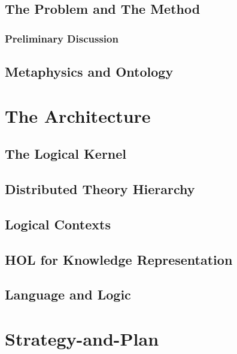 \subsection{The Problem and The Method}\label{the-problem-and-the-method}

\subsubsection{Preliminary Discussion}\label{preliminary-discussion}

\subsection{Metaphysics and Ontology}\label{metaphysics-and-ontology}

\section{The Architecture}\label{the-architecture}

\subsection{The Logical Kernel}\label{the-logical-kernel}

\subsection{Distributed Theory Hierarchy}\label{distributed-theory-hierarchy}

\subsection{Logical Contexts}\label{logical-contexts}

\subsection{HOL for Knowledge Representation}\label{hol-for-knowledge-representation}

\subsection{Language and Logic}\label{language-and-logic}

\section{Strategy-and-Plan}\label{strategy-and-plan}


